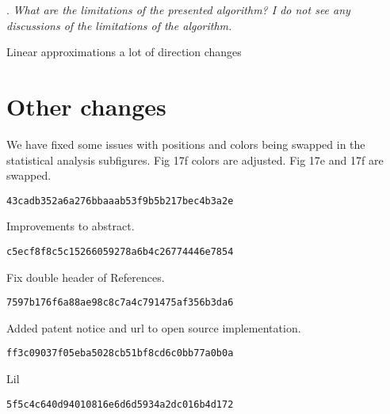 \documentclass[5p,twocolumn,10pt,times]{elsarticle}
\theoremstyle{definition}
\newcommand{\commits}[1]{{\bf\begin{alltt} {#1}\end{alltt}}}
\newcommand\Que[1]{%
   \leavevmode\par
   \stepcounter{question}
   \noindent
   \thequestion. {\it#1}\par}
\newcounter{question}
\numberwithin{question}{section}
\begin{document}
\Que{
What are the limitations of the presented algorithm? I do not see any discussions of the limitations of the algorithm.
}
Linear approximations 
a lot of direction changes














\section{Other changes}
We have fixed some issues with positions and colors being swapped in the statistical analysis subfigures.
Fig 17f colors are adjusted.
Fig 17e and 17f are swapped.
\commits{43cadb352a6a276bbaaab53f9b5b217bec4b3a2e}

Improvements to abstract.
\commits{c5ecf8f8c5c15266059278a6b4c26774446e7854}

Fix double header of References.
\commits{7597b176f6a88ae98c8c7a4c791475af356b3da6}

Added patent notice and url to open source implementation.
\commits{ff3c09037f05eba5028cb51bf8cd6c0bb77a0b0a}

Lil
\commits{5f5c4c640d94010816e6d6d5934a2dc016b4d172}
\end{document}
